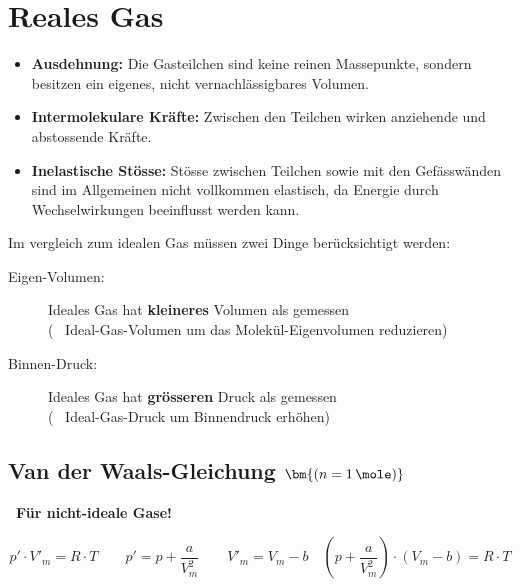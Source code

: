 \section{Reales Gas}
\begin{itemize}
    \item \textbf{Ausdehnung:} Die Gasteilchen sind keine reinen Massepunkte, sondern besitzen ein eigenes, nicht vernachlässigbares Volumen.
    \item \textbf{Intermolekulare Kräfte:} Zwischen den Teilchen wirken anziehende und abstossende Kräfte.
    \item \textbf{Inelastische Stösse:} Stösse zwischen Teilchen sowie mit den Gefässwänden sind im Allgemeinen nicht vollkommen elastisch, da Energie durch Wechselwirkungen beeinflusst werden kann.
\end{itemize}

Im vergleich zum idealen Gas müssen zwei Dinge berücksichtigt werden:
\begin{description}
	\item[Eigen-Volumen:] Ideales Gas hat \textbf{kleineres} Volumen als gemessen \\
		( \textrightarrow\ Ideal-Gas-Volumen um das Molekül-Eigenvolumen reduzieren)
	\item[Binnen-Druck:] Ideales Gas hat \textbf{grösseren} Druck als gemessen \\
		( \textrightarrow\ Ideal-Gas-Druck um Binnendruck erhöhen) 
\end{description}


\subsection[Van der Waals-Gleichung (1 mol)]{Van der Waals-Gleichung $\bm{(n = 1 \, \mole)}$}

\textbf{\textrightarrow\ Für nicht-ideale Gase!} \vspace{-1em}

\[\boxed{ p' \cdot V'_m = R \cdot T } \qquad \boxed{ p' = p + \frac{a}{V_m^2} } \qquad 
\boxed{ V'_m = V_m - b } \quad \boxed{\left(p+\frac{a}{V_m^2}\right) \cdot (V_m - b) = R \cdot T}\]



